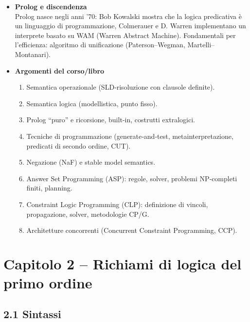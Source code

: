 \documentclass[12pt]{article}
\begin{document}
\begin{itemize}
  \item \textbf{Prolog e discendenza}\\
    Prolog nasce negli anni ’70: Bob Kowalski mostra che la logica predicativa è un linguaggio di programmazione, Colmerauer e D. Warren implementano un interprete basato su WAM (Warren Abstract Machine). Fondamentali per l’efficienza: algoritmo di unificazione (Paterson–Wegman, Martelli–Montanari).

  \item \textbf{Argomenti del corso/libro}
    \begin{enumerate}
      \item Semantica operazionale (SLD‐risoluzione con clausole definite).
      \item Semantica logica (modellistica, punto fisso).
      \item Prolog ``puro'' e ricorsione, built‐in, costrutti extralogici.
      \item Tecniche di programmazione (generate‐and‐test, metainterpretazione, predicati di secondo ordine, CUT).
      \item Negazione (NaF) e stable model semantics.
      \item Answer Set Programming (ASP): regole, solver, problemi NP‐completi finiti, planning.
      \item Constraint Logic Programming (CLP): definizione di vincoli, propagazione, solver, metodologie CP/G.
      \item Architetture concorrenti (Concurrent Constraint Programming, CCP).
    \end{enumerate}
\end{itemize}

\section*{Capitolo 2 – Richiami di logica del primo ordine}

\subsection*{2.1 Sintassi}
\end{document}
